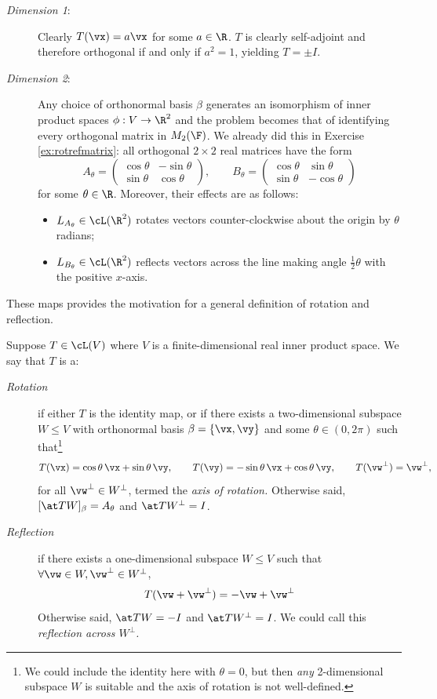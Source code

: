 \begin{description}
	\item[\normalfont\emph{Dimension 1}:] Clearly $T(\vx)=a\vx$ for some $a\in\R$. $T$ is clearly self-adjoint and therefore orthogonal if and only if $a^2=1$, yielding $T=\pm I$.
	\item[\normalfont\emph{Dimension 2}:] Any choice of orthonormal basis $\beta$ generates an isomorphism of inner product spaces $\phi:V\to\R^2$ and the problem becomes that of identifying every orthogonal matrix in $M_2(\F)$. We already did this in Exercise \ref{ex:rotrefmatrix}: all orthogonal $2\times 2$ real matrices have the form
\[A_\theta=\begin{pmatrix}
	\cos\theta&-\sin\theta\\
	\sin\theta&\cos\theta
  \end{pmatrix},\qquad B_\theta=\begin{pmatrix}
	\cos\theta&\sin\theta\\
	\sin\theta&-\cos\theta
	\end{pmatrix}\]
for some $\theta\in\R$. Moreover, their effects are as follows:
	\begin{itemize}
	  \item $L_{A_\theta}\in\cL(\R^2)$ rotates vectors counter-clockwise about the origin by $\theta$ radians;
	  \item $L_{B_\theta}\in\cL(\R^2)$ reflects vectors across the line making angle $\frac 12\theta$ with the positive $x$-axis.
	\end{itemize}
\end{description}
	
These maps provides the motivation for a general definition of rotation and reflection.
	
\begin{defn}{}{}
Suppose $T\in\cL(V)$ where $V$ is a finite-dimensional real inner product space. We say that $T$ is a:
\begin{description}
  \item[\normalfont\emph{Rotation}] if either $T$ is the identity map, or if there exists a two-dimensional subspace $W\le V$ with orthonormal basis $\beta=\{\vx,\vy\}$ and some $\theta\in(0,2\pi)$ such that\footnote{We could include the identity here with $\theta=0$, but then \emph{any} 2-dimensional subspace $W$ is suitable and the axis of rotation is not well-defined.}
  \[T(\vx)=\cos\theta\,\vx+\sin\theta\,\vy,\qquad T(\vy)=-\sin\theta\,\vx+\cos\theta\,\vy,\qquad T(\vw^\perp)=\vw^\perp,\]
  for all $\vw^\perp\in W^\perp$, termed the \emph{axis of rotation.} Otherwise said, $[\at T{W}]_\beta=A_\theta$ and $\at T{W^\perp}=I$. 
  
  \item[\normalfont\emph{Reflection}] if there exists a one-dimensional subspace $W\le V$ such that $\forall \vw\in W,\vw^\perp\in W^\perp$,
  \[T(\vw+\vw^\perp)=-\vw+\vw^\perp\]
  Otherwise said, $\at T{W}=-I$ and $\at T{W^\perp}=I$. We could call this \emph{reflection across $W^\perp$.}
\end{description}
\end{defn}

